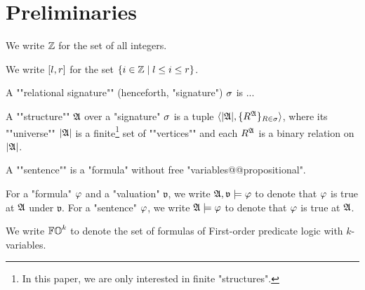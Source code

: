 \section{Preliminaries}\label{sec: preliminaries}






\AP We write $\mathbb{Z}$ for the set of all integers.

\AP We write $[l, r]$ for the set $\{i \in \mathbb{Z} \mid l \le i \le r\}$.

\AP A ""relational signature"" (henceforth, "signature") $\sigma$ is ...

\AP A ""structure"" $\struc$ over a "signature" $\sigma$ is a tuple $\tuple{\univ{\struc}, \set{R^{\struc}}_{R \in \sig}}$,
where its ""universe"" $\univ{\struc}$ is a finite\footnote{In this paper, we are only interested in finite "structures".} set of ""vertices""
and each $R^{\struc}$ is a binary relation on $\univ{\struc}$.

\AP A ""sentence"" is a "formula" without free "variables@@propositional".

For a "formula" $\fml$ and a "valuation" $\mathfrak{v}$, we write 
$\struc, \mathfrak{v} \models \fml$ to denote that $\fml$ is true at $\struc$ under $\mathfrak{v}$.
For a "sentence" $\fml$, we write $\struc \models \fml$ to denote that $\fml$ is true at $\struc$.

We write $\mathbb{FO}^k$ to denote the set of formulas of First-order predicate logic with $k$-variables.

